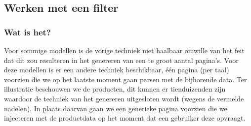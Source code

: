 \documentclass{article}
\begin{document}
	\subsection{Werken met een filter} 
	\subsubsection{Wat is het?}
    Voor sommige modellen is de vorige techniek niet haalbaar omwille van het feit dat dit zou resulteren in het genereren van een te groot aantal pagina's. Voor deze modellen is er een andere techniek beschikbaar, \'e\'en pagina (per taal) voorzien die we op het laatste moment gaan parsen met de bijhorende data. Ter illustratie beschouwen we de producten, dit kunnen er tienduizenden zijn waardoor de techniek van het genereren uitgesloten wordt (wegens de vermelde nadelen). In plaats daarvan gaan we een generieke pagina voorzien die we injecteren met de productdata op het moment dat een gebruiker deze opvraagt. 
\end{document}
